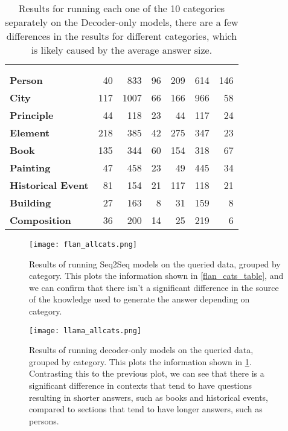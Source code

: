 \begin{table}[p]
	\centering
	\footnotesize
	\begin{tabular}{>{\bfseries}l | r r r | r r r}
		\toprule
			& \multicolumn{3}{c|}{\smallllama{}} & \multicolumn{3}{c}{\bigllama{}} \\
			& \Parametric{} & \Contextual{} & \Other{} & \Parametric{} & \Contextual{} & \Other{} \\
		\midrule
			Person           &  40 &  833 & 96 & 209 & 614 & 146 \\
			City             & 117 & 1007 & 66 & 166 & 966 &  58 \\
			Principle        &  44 &  118 & 23 &  44 & 117 &  24 \\
			Element          & 218 &  385 & 42 & 275 & 347 &  23 \\
			Book             & 135 &  344 & 60 & 154 & 318 &  67 \\
			Painting         &  47 &  458 & 23 &  49 & 445 &  34 \\
			Historical Event &  81 &  154 & 21 & 117 & 118 &  21 \\
			Building         &  27 &  163 &  8 &  31 & 159 &   8 \\
			Composition      &  36 &  200 & 14 &  25 & 219 &   6 \\
		\bottomrule
	\end{tabular}
	\caption{Results for running each one of the 10 categories separately on the Decoder-only models, there are a few differences in the results for different categories, which is likely caused by the average answer size.}
	\label{llama_cats_table}
\end{table}

\begin{figure}[p]
	\centering
	\texttt{[image: flan\_allcats.png]}
	\caption{Results of running Seq2Seq models on the queried data, grouped by category. This plots the information shown in \cref{flan_cats_table}, and we can confirm that there isn't a significant difference in the source of the knowledge used to generate the answer depending on category.}
	\label{flan_cats_result}
\end{figure}

\begin{figure}[p]
	\centering
	\texttt{[image: llama\_allcats.png]}
	\caption{Results of running decoder-only models on the queried data, grouped by category. This plots the information shown in \cref{llama_cats_table}. Contrasting this to the previous plot, we can see that there is a significant difference in contexts that tend to have questions resulting in shorter answers, such as books and historical events, compared to sections that tend to have longer answers, such as persons.}
	\label{llama_cats_result}
\end{figure}

